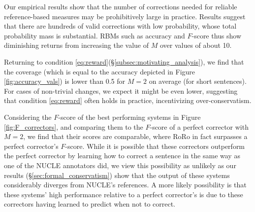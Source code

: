 \documentclass[letterpaper, 11pt]{article}
\newcommand{\oa}[1]{\footnote{\color{red}OA: #1}}
\begin{document}
Our empirical results show that the number of corrections needed for reliable reference-based measures may
be prohibitively large in practice.
Results suggest that there are hundreds of valid corrections with low probability, whose total probability mass
is substantial. RBMs such as accuracy and $F$-score thus show diminishing returns from increasing the value of $M$ over values of about 10.
%
%
%

Returning to condition \ref{eq:reward}(\S \ref{subsec:motivating_analysis}), we find that the coverage
(which is equal to the accuracy depicted in Figure \ref{fig:accuracy_vals})
is lower than 0.5 for $M=2$ on average (for short sentences). For cases of non-trivial
changes, we expect it might be even lower, suggesting that condition \ref{eq:reward} often
holds in practice, incentivizing over-conservatism.

Considering the $F$-score of the best performing systems in Figure \ref{fig:F_correctors}, and
comparing them to the $F$-score of a perfect corrector with $M=2$, we find that their scores are comparable,
where RoRo in fact surpasses a perfect corrector's $F$-score.
While it is possible that these correctors outperform the perfect corrector by learning how to
correct a sentence in the same way as one of the NUCLE annotators did, we view this possibility
as unlikely as our results (\S\ref{sec:formal_conservatism}) show that
the output of these systems considerably diverges from NUCLE's references.
A more likely possibility is that these systems' high performance relative to a perfect corrector's
is due to these correctors having learned to predict when not to correct.
\end{document}
